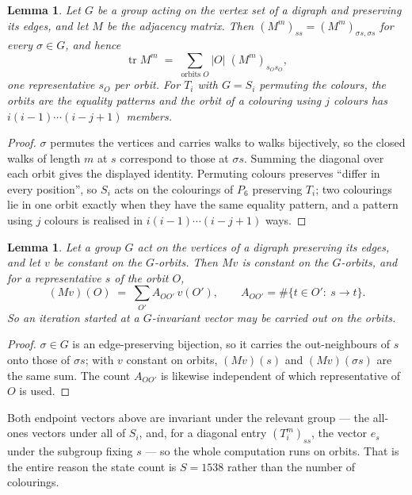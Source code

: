 \documentclass[11pt,a4paper]{article}
\theoremstyle{plain}
\newtheorem{lemma}[theorem]{Lemma}
\theoremstyle{definition}
\begin{document}
\begin{lemma}\label{lem:trace}
Let $G$ be a group acting on the vertex set of a digraph and preserving its edges, and let $M$
be the adjacency matrix. Then $(M^m)_{ss}=(M^m)_{\sigma s,\sigma s}$ for every
$\sigma\in G$, and hence
\[
\operatorname{tr} M^m\;=\;\sum_{\text{orbits }O}|O|\;(M^m)_{s_O s_O} ,
\]
one representative $s_O$ per orbit. For $T_i$ with $G=S_i$ permuting the colours, the orbits
are the equality patterns and the orbit of a colouring using $j$ colours has
$i(i-1)\cdots(i-j+1)$ members.
\end{lemma}

\begin{proof}
$\sigma$ permutes the vertices and carries walks to walks bijectively, so the closed walks of
length $m$ at $s$ correspond to those at $\sigma s$. Summing the diagonal over each orbit
gives the displayed identity. Permuting colours preserves ``differ in every position'', so
$S_i$ acts on the colourings of $P_{6}$ preserving $T_i$; two colourings lie in one orbit
exactly when they have the same equality pattern, and a pattern using $j$ colours is realised
in $i(i-1)\cdots(i-j+1)$ ways.
\end{proof}

\begin{lemma}\label{lem:lump}
Let a group $G$ act on the vertices of a digraph preserving its edges, and let $v$ be constant
on the $G$-orbits. Then $Mv$ is constant on the $G$-orbits, and for a representative $s$ of
the orbit $O$,
\[
(Mv)(O)\;=\;\sum_{O'}A_{OO'}\,v(O'),\qquad
A_{OO'}=\#\{t\in O':\ s\to t\} .
\]
So an iteration started at a $G$-invariant vector may be carried out on the orbits.
\end{lemma}

\begin{proof}
$\sigma\in G$ is an edge-preserving bijection, so it carries the out-neighbours of $s$ onto
those of $\sigma s$; with $v$ constant on orbits, $(Mv)(s)$ and $(Mv)(\sigma s)$ are the same
sum. The count $A_{OO'}$ is likewise independent of which representative of $O$ is used.
\end{proof}

Both endpoint vectors above are invariant under the relevant group --- the all-ones vectors
under all of $S_i$, and, for a diagonal entry $(T_i^m)_{ss}$, the vector $e_s$ under the
subgroup fixing $s$ --- so the whole computation runs on orbits. That is the entire reason the
state count is $S=1538$ rather than the number of colourings.
\end{document}
